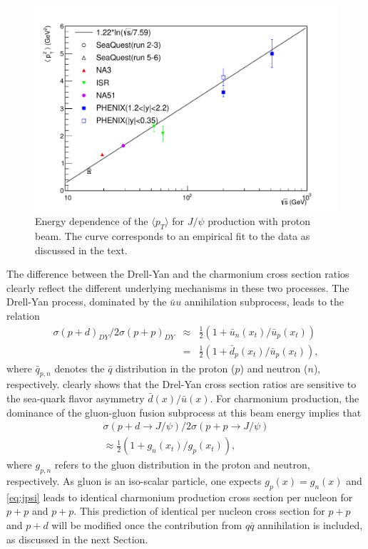 \documentclass[reprint,aps,unsortedaddress,superscriptaddress,prd,floatfix,showpacs,linenumbers]{revtex4-2}
\begin{document}
\begin{figure}[tb]
\includegraphics*[width=\linewidth]{crossSections/pT/pT_s_release}
\caption{Energy dependence of the $\langle p_T \rangle$
for $J/\psi$ production with proton beam. The curve corresponds to
an empirical fit to the data
as discussed in the text.}
\label{fig6}
\end{figure}


The difference between the Drell-Yan and the charmonium
cross section ratios clearly reflect the different underlying mechanisms in 
these two processes. The Drell-Yan process, dominated by the
$\bar u u$  annihilation subprocess, leads to the relation
\begin{align}
\sigma(p+d)_{DY}/2\sigma(p+p)_{DY} & \approx &
\frac{1}{2} (1+ \bar u_n(x_t)/\bar u_p(x_t)) \nonumber \\
 & = & \frac{1}{2} (1 + \bar d_p(x_t)/\bar u_p(x_t)),
\label{eq:DY}
\end{align}
where $\bar q_{p,n}$ denotes the $\bar q$ distribution in the proton ($p$)
and neutron ($n$), respectively.  clearly shows that the Drel-Yan
cross section ratios are sensitive to the sea-quark flavor asymmetry 
$\bar d(x) / \bar u(x)$. For charmonium production, the dominance of the 
gluon-gluon fusion subprocess at this beam energy implies that
\begin{align}
\sigma(p+d \to J/\psi)/2\sigma(p+p \to J/\psi) \nonumber \\
\approx \frac{1}{2} (1+ g_n(x_t)/g_p(x_t)),
\label{eq:jpsi}
\end{align}
where $g_{p,n}$ refers to the gluon distribution in the proton
and neutron, respectively. As gluon is an iso-scalar particle, one expects
$g_p(x) = g_n(x)$ and \cref{eq:jpsi} leads to identical charmonium production cross
section per nucleon for $p+p$ and $p+p$. This prediction of identical
per nucleon cross section for $p+p$ and $p+d$ will be modified once the 
contribution from $q \bar q$ annihilation is included, as discussed in the
next Section.  
\end{document}
